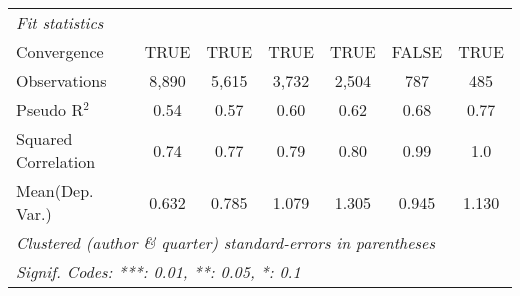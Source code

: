 \begin{tabular}{lcccccc}
   \midrule
   \emph{Fit statistics}\\
   Convergence                                                &TRUE           & TRUE    & TRUE          & TRUE          & FALSE        & TRUE\\  
   Observations                                               & 8,890         & 5,615   & 3,732         & 2,504         & 787          & 485\\  
   Pseudo R$^2$                                               & 0.54          & 0.57    & 0.60          & 0.62          & 0.68         & 0.77\\  
   Squared Correlation                                        & 0.74          & 0.77    & 0.79          & 0.80          & 0.99         & 1.0\\  
Mean(Dep. Var.) & 0.632 & 0.785 & 1.079 & 1.305 & 0.945 & 1.130 \\
   \midrule \midrule
   \multicolumn{7}{l}{\emph{Clustered (author \& quarter) standard-errors in parentheses}}\\
   \multicolumn{7}{l}{\emph{Signif. Codes: ***: 0.01, **: 0.05, *: 0.1}}\\
\end{tabular}
\par\endgroup
